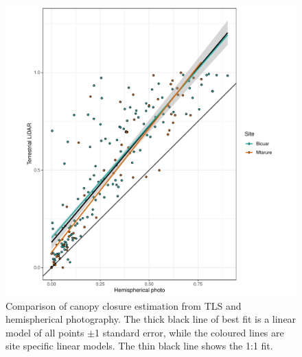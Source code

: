 \documentclass[11pt,a4paper]{article}
\begin{document}
\begin{figure}
\centering
	\includegraphics[width=\linewidth]{tls_hemi_compare}
	\caption{Comparison of canopy closure estimation from TLS and hemispherical photography. The thick black line of best fit is a linear model of all points $\pm$1 standard error, while the coloured lines are site specific linear models. The thin black line shows the 1:1 fit.}
	\label{tls_hemi_compare}
\end{figure}
\end{document}
